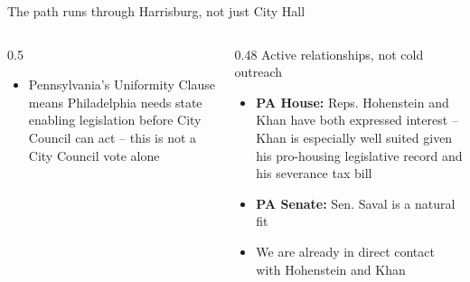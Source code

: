 \documentclass[aspectratio=169,11pt]{beamer}
\begin{document}
\begin{frame}{The path runs through Harrisburg, not just City Hall}
\begin{columns}[T]
\begin{column}{0.5\linewidth}
\vspace{0.6em}
\begin{itemize}
\item Pennsylvania's Uniformity Clause means Philadelphia needs state enabling legislation before City Council can act -- this is not a City Council vote alone
\end{itemize}
\end{column}
\begin{column}{0.48\linewidth}
\vspace{0.6em}
{\small\color{deckmuted} Active relationships, not cold outreach}\\[0.4em]
\begin{itemize}
\item \textbf{PA House:} Reps. Hohenstein and Khan have both expressed interest -- Khan is especially well suited given his pro-housing legislative record and his severance tax bill
\item \textbf{PA Senate:} Sen. Saval is a natural fit
\item We are already in direct contact with Hohenstein and Khan
\end{itemize}
\end{column}
\end{columns}
\end{frame}
\end{document}
